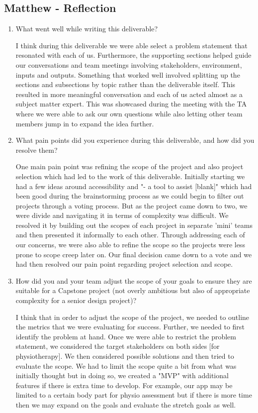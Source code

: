\documentclass{article}
\begin{document}
\subsection*{Matthew - Reflection}
\begin{enumerate}
    \item What went well while writing this deliverable? 

    I think during this deliverable we were able select a problem statement that resonated with each of us.
    Furthermore, the supporting sections helped guide our conversations and team meetings involving stakeholders,
    environment, inputs and outputs. Something that worked well involved splitting up the sections and subsections
    by topic rather than the deliverable itself. This resulted in more meaningful conversation and each of us acted
    almost as a subject matter expert. This was showcased during the meeting with the TA where we were able to ask
    our own questions while also letting other team members jump in to expand the idea further.

    \item What pain points did you experience during this deliverable, and how
    did you resolve them?

    One main pain point was refining the scope of the project and also project selection which had led to the work
    of this deliverable. Initially starting we had a few ideas around accessibility and "- a tool to assist [blank]" which
    had been good during the brainstorming process as we could begin to filter out projects through a voting process.
    But as the project came down to two, we were divide and navigating it in terms of complexity was difficult. We resolved
    it by building out the scopes of each project in separate 'mini' teams and then presented it informally to each other.
    Through addressing each of our concerns, we were also able to refine the scope so the projects were less prone to
    scope creep later on. Our final decision came down to a vote and we had then resolved our pain point regarding project
    selection and scope.

    \item How did you and your team adjust the scope of your goals to ensure
    they are suitable for a Capstone project (not overly ambitious but also of
    appropriate complexity for a senior design project)?

    I think that in order to adjust the scope of the project, we needed to outline the metrics that we were evaluating for 
    success. Further, we needed to first identify the problem at hand. Once we were able to restrict the problem statement,
    we considered the target stakeholders on both sides [for physiotherapy]. We then considered possible solutions and then
    tried to evaluate the scope. We had to limit the scope quite a bit from what was initially thought but in doing so, we
    created a "MVP" with additional features if there is extra time to develop. For example, our app may be limited to a 
    certain body part for physio assessment but if there is more time then we may expand on the goals and evaluate the 
    stretch goals as well.
\end{enumerate}  
\end{document}
